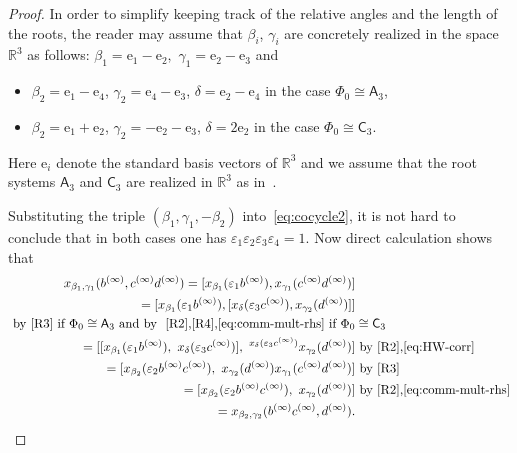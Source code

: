 \documentclass[oneside, 11pt]{amsart}
\numberwithin{equation}{section}
\theoremstyle{definition}
\theoremstyle{remark}
\newcommand{\rA}{\mathsf{A}}
\newcommand{\rC}{\mathsf{C}}
\begin{document}
\begin{proof}
In order to simplify keeping track of the relative angles and the length of the roots, the reader may assume that  $\beta_i$, $\gamma_i$ are concretely realized in the space $\mathbb{R}^3$ as follows:
\(\beta_1 = \mathrm e_1 - \mathrm e_2,\) \(\gamma_1 = \mathrm e_2 - \mathrm e_3\) and
 \begin{itemize}
 \item $\beta_2 = \mathrm e_1 - \mathrm e_4$, $\gamma_2 = \mathrm e_4 - \mathrm e_3$, $\delta = \mathrm e_2 - \mathrm e_4$ in the case \(\Phi_0\cong\rA_3\), \item $\beta_2 = \mathrm e_1 + \mathrm e_2$, $\gamma_2 = -\mathrm e_2 - \mathrm e_3$, $\delta = 2 \mathrm e_2$ in the case \(\Phi_0\cong\rC_3\).
\end{itemize}
Here $\mathrm e_i$ denote the standard basis vectors of $\mathbb{R}^3$ and we assume that the root systems $\rA_3$ and $\rC_3$ are realized in $\mathbb{R}^3$ as in~\cite[Ch.~VI,~\S\S~4.6--4.7]{Bou81}. 

 Substituting the triple $(\beta_1, \gamma_1, -\beta_2)$ into~\eqref{eq:cocycle2}, it is not hard to conclude that in both cases one has $\varepsilon_1 \varepsilon_2 \varepsilon_3 \varepsilon_4 = 1$. Now direct calculation shows that
 \begin{align*}
x_{\beta_1, \gamma_1}(b^{(\infty)}, c^{(\infty)} d^{(\infty)}) = [x_{\beta_1}(\varepsilon_1b^{(\infty)}), x_{\gamma_1}(c^{(\infty)} d^{(\infty)})] & \nonumber \\
= [x_{\beta_1}(\varepsilon_1b^{(\infty)}), [x_{\delta}(\varepsilon_3c^{(\infty)}), x_{\gamma_2}(d^{(\infty)})]]&\\
\text{  by~\eqref{R3} if } \Phi_0 \cong \rA_3 \text{ and by ~\eqref{R2},\eqref{R4},\eqref{eq:comm-mult-rhs} if } \Phi_0 &\cong \rC_3 \nonumber \\ 
= [[x_{\beta_1}(\varepsilon_1b^{(\infty)}),\ x_\delta(\varepsilon_3c^{(\infty)})],\ {}^{x_\delta(\varepsilon_3c^{(\infty)})}x_{\gamma_2}(d^{(\infty)})] & \text{ by~\eqref{R2},\eqref{eq:HW-corr}}\\
= [x_{\beta_2}(\varepsilon_2b^{(\infty)}c^{(\infty)}),\ x_{\gamma_2}(d^{(\infty)}) x_{\gamma_1}(c^{(\infty)}d^{(\infty)}) ] & \text{ by~\eqref{R3}}\\
= [x_{\beta_2}(\varepsilon_2b^{(\infty)}c^{(\infty)}),\ x_{\gamma_2}(d^{(\infty)})] &\text{ by~\eqref{R2},\eqref{eq:comm-mult-rhs}} \\
= x_{\beta_2, \gamma_2}(b^{(\infty)} c^{(\infty)}, d^{(\infty)}). & \end{align*}


\end{proof}
\end{document}
